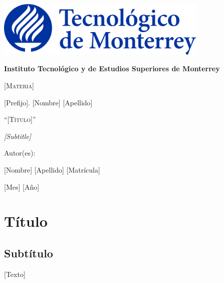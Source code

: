 \documentclass[11pt]{exam}
\begin{document}
    \begin{titlepage}
        \centering
        {\includegraphics[width = 4in]{pictures/itesm-logo.png}\par}
        \vspace{0.4in}
        {\bfseries\LARGE Instituto Tecnol\'ogico y de Estudios Superiores de Monterrey \par}
        \vspace{0.4in}
        {\scshape\Large [Materia] \par}
        {\Large [Prefijo]. [Nombre] [Apellido] \par}
        \vspace{1.2in}
        {\scshape\Large ``[T\'itulo]'' \par}
        \vspace{1.2in}
        {\itshape\Large [Subtitle] \par}
        \vfill
        {\Large Autor(es): \par}
        {\Large [Nombre] [Apellido] [Matrícula] \par}
        \vfill
        {\Large [Mes] [Año] \par}
    \end{titlepage}

    \headrule
    \footrule

    \section*{T\'itulo}
    \subsection*{Subt\'itulo}
        [Texto]
\end{document}

